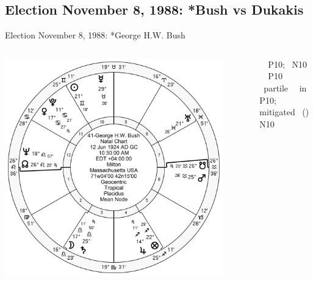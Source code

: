 \subsection{Election November 8, 1988: *Bush vs Dukakis}
\begin{frame}[t]{Election November 8, 1988: *George H.W. Bush}
\small

\begin{columns}[T, onlytextwidth]
\vspace{-1em}
{\includegraphics[width=0.9\textwidth]{charts/GHW-Bush.png}}
\fontsize{8pt}{9pt}\selectfont

\Jupiter\, \Sextile\, P10; \Opposition\, N10 \\
\Mercury\, \Trine\, P10 \\
\Mars\, partile \Trine\, \Saturn\, in P10; mitigated \Quincunx\, (\Opposition) N10 \\


\end{columns}
\end{frame}
